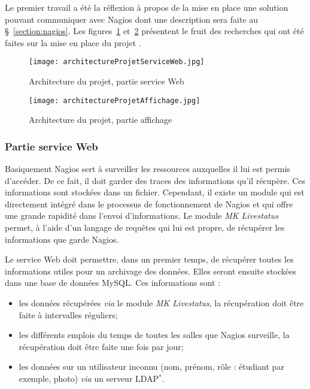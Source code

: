 Le premier travail a \'et\'e la r\'eflexion \`a propos de la mise en place une solution pouvant communiquer avec Nagios dont une description sera faite au \S~\ref{section:nagios}.
Les figures~\ref{figure:architectureProjetServiceWeb} et~\ref{figure:architectureProjetAffichage} pr\'esentent le fruit des recherches qui ont \'et\'e faites sur la mise en place du projet \YuukouII.

\begin{figure}[!ht]
	\centering
	\texttt{[image: architectureProjetServiceWeb.jpg]}
	\caption{Architecture du projet, partie service Web}
	\label{figure:architectureProjetServiceWeb}

\end{figure}

\begin{figure}[!ht]
	\centering
	\texttt{[image: architectureProjetAffichage.jpg]}
	\caption{Architecture du projet, partie affichage}
	\label{figure:architectureProjetAffichage}

\end{figure}

\subsubsection{Partie service Web}

Basiquement Nagios sert \`a surveiller les ressources auxquelles il lui est permis d'acc\'eder.
De ce fait, il doit garder des traces des informations qu'il r\'ecup\`ere.
Ces informations sont stock\'ees dans un fichier.
Cependant, il existe un module qui est directement int\'egr\'e dans le processus de fonctionnement de Nagios et qui offre une grande rapidit\'e dans l'envoi d'informations.
Le module \textit{MK Livestatus} permet, \`a l'aide d'un langage de requ\^etes qui lui est propre, de r\'ecup\'erer les informations que garde Nagios.

Le service Web doit permettre, dans un premier temps, de r\'ecup\'erer toutes les informations utiles pour un archivage des donn\'ees.
Elles seront ensuite stock\'ees dans une base de donn\'ees MySQL.
\noindent Ces informations sont :

\begin{itemize}
	\item les donn\'ees r\'ecup\'er\'ees \textit{via} le module \textit{MK Livestatus}, la r\'ecup\'eration doit \^etre faite \`a intervalles r\'eguliers;
	\item les diff\'erents emplois du temps de toutes les salles que Nagios surveille, la r\'ecup\'eration doit \^etre faite une fois par jour;
	\item les donn\'ees sur un utilisateur inconnu (nom, pr\'enom, r\^ole : \'etudiant par exemple, photo) \textit{via} un serveur LDAP$^*$.

\end{itemize}

